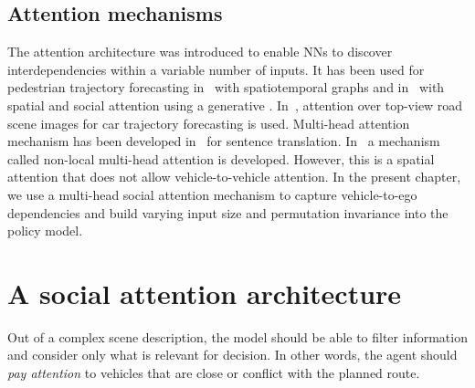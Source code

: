 \subsection{Attention mechanisms} 

The attention architecture was introduced to enable \glspl*{NN}  to discover interdepen\-dencies within a variable number of inputs.
It has been used for pedestrian trajectory forecasting in~\citep{Vemula2018} with spatiotemporal graphs and in~\citep{Sadeghian2019CVPR} with spatial and social attention using a generative . In~\citep{Sadeghian2018ECCV}, attention over top-view road scene images for car trajectory forecasting is used. Multi-head attention mechanism has been developed in~\citep{Vaswani2017} for sentence translation. In~\citep{Messaoud2019} a mechanism called non-local multi-head attention is developed. However, this is a spatial attention that does not allow vehicle-to-vehicle attention. In the present chapter, we use a multi-head social attention mechanism to capture vehicle-to-ego dependencies and build varying input size and permutation invariance into the policy model.

\section{A social attention architecture}
\label{sec:architecture}

Out of a complex scene description, the model should be able to filter information and consider only what is relevant for decision. In other words, the agent should \emph{pay attention} to vehicles that are close or conflict with the planned route.

